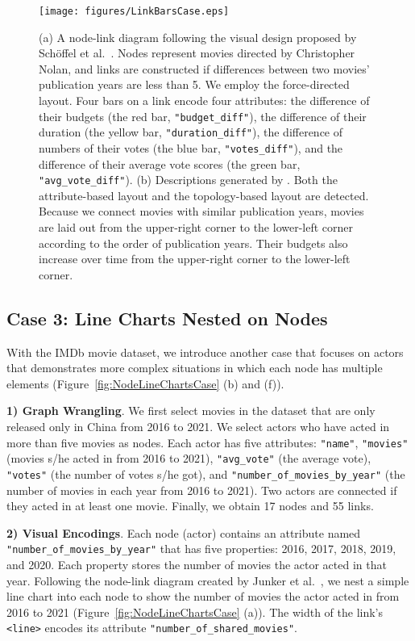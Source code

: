 \begin{figure*}[ht]
    \centering
    \texttt{[image: figures/LinkBarsCase.eps]}
    \caption{ (a) A node-link diagram following the visual design proposed by Sch{\"{o}}ffel et al.~\cite{DBLP:conf/iv/SchoffelSE16}. Nodes represent movies directed by Christopher Nolan, and links are constructed if differences between two movies' publication years are less than 5. We employ the force-directed layout. Four bars on a link encode four attributes: the difference of their budgets (the red bar, \texttt{"budget\_diff"}), the difference of their duration (the yellow bar, \texttt{"duration\_diff"}), the difference of numbers of their votes (the blue bar, \texttt{"votes\_diff"}), and the difference of their average vote scores (the green bar, \texttt{"avg\_vote\_diff"}). (b) Descriptions generated by \ApproachName. Both the attribute-based layout and the topology-based layout are detected. Because we connect movies with similar publication years, movies are laid out from the upper-right corner to the lower-left corner according to the order of publication years. Their budgets also increase over time from the upper-right corner to the lower-left corner.}
    \label{fig:LinkBarsCase}
\end{figure*}

\subsection{Case 3: Line Charts Nested on Nodes}
With the IMDb movie dataset, we introduce another case that focuses on actors that demonstrates more complex situations in which each node has multiple elements (Figure~\ref{fig:NodeLineChartsCase} (b) and (f)).

\noindent \textbf{1) Graph Wrangling}. 
We first select movies in the dataset that are only released only in China from 2016 to 2021.
We select actors who have acted in more than five movies as nodes.
Each actor has five attributes: \texttt{"name"}, \texttt{"movies"} (movies s/he acted in from 2016 to 2021), \texttt{"avg\_vote"} (the average vote), \texttt{"votes"} (the number of votes s/he got), and \texttt{"number\_of\_movies\_by\_year"} (the number of movies in each year from 2016 to 2021).
Two actors are connected if they acted in at least one movie.
Finally, we obtain 17 nodes and 55 links.

\noindent \textbf{2) Visual Encodings}. 
Each node (actor) contains an attribute named \texttt{"number\_of\_movies\_by\_year"} that has five properties: 2016, 2017, 2018, 2019, and 2020.
Each property stores the number of movies the actor acted in that year.
Following the node-link diagram created by Junker et al.~\cite{DBLP:journals/bmcbi/JunkerKS06}, 
we nest a simple line chart into each node to show the number of movies the actor acted in from 2016 to 2021 (Figure~\ref{fig:NodeLineChartsCase} (a)). 
The width of the link's \texttt{<line>} encodes its attribute \texttt{"number\_of\_shared\_movies"}.

